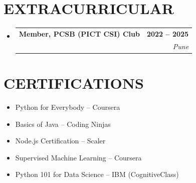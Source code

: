 \documentclass[letterpaper,11pt]{article}
\makeatletter
\newcommand{\resumeSubheading}[4]{
  \vspace{-2pt}\item
    \begin{tabular*}{1.0\textwidth}[t]{l@{\extracolsep{\fill}}r}
      \textbf{\large#1} & \textbf{\small #2} \\
      \textit{\large#3} & \textit{\small #4} \\
    \end{tabular*}\vspace{-7pt}
}
\newcommand{\resumeSubHeadingListStart}{\begin{itemize}[leftmargin=0.0in, label={}]}
\newcommand{\resumeSubHeadingListEnd}{\end{itemize}}
\makeatother
\begin{document}
\section{EXTRACURRICULAR}
\resumeSubHeadingListStart
\resumeSubheading
{Member, PCSB (PICT CSI) Club}{2022 -- 2025}{ }{Pune}
\resumeSubHeadingListEnd

\section{CERTIFICATIONS}
\small
\begin{itemize}[leftmargin=*]
  \item Python for Everybody – Coursera
  \item Basics of Java – Coding Ninjas
  \item Node.js Certification – Scaler
  \item Supervised Machine Learning – Coursera
  \item Python 101 for Data Science – IBM (CognitiveClass)
\end{itemize}
\end{document}
